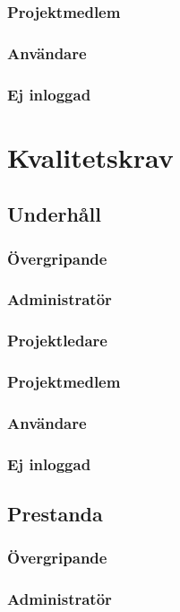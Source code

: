 \documentclass[a4paper]{article}
\begin{document}
		\subsubsection*{Projektmedlem}
		\subsubsection*{Användare}
		\subsubsection*{Ej inloggad}


\section{Kvalitetskrav}
	\subsection{Underhåll}
		\subsubsection*{Övergripande}
		\subsubsection*{Administratör}
		\subsubsection*{Projektledare}
		\subsubsection*{Projektmedlem}
		\subsubsection*{Användare}
		\subsubsection*{Ej inloggad}

	\subsection{Prestanda}
		\subsubsection*{Övergripande}
		\subsubsection*{Administratör}
\end{document}
